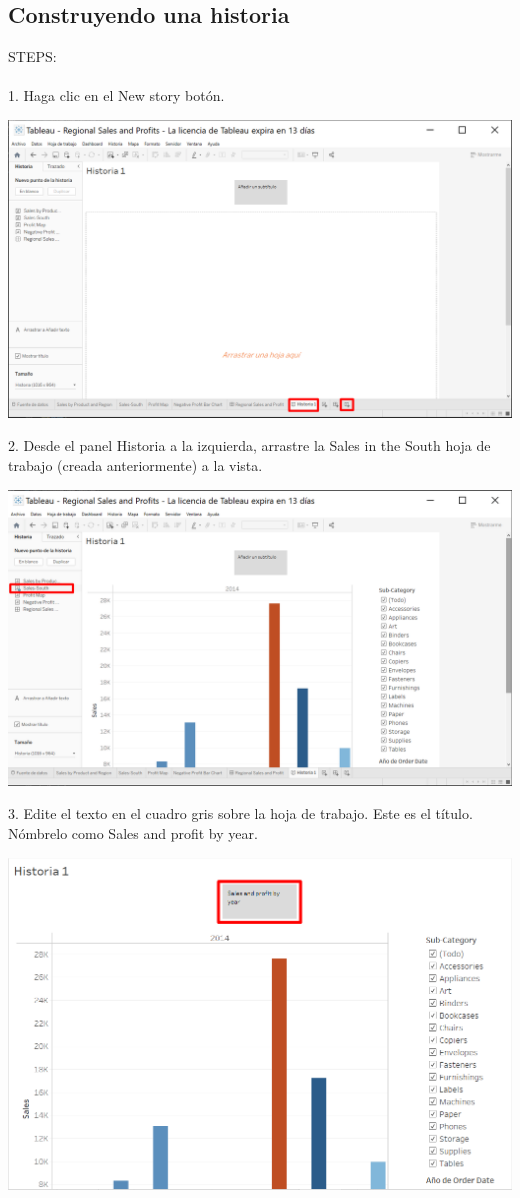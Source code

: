 \documentclass[12pt,letterpaper]{article}
\begin{document}
\subsection{Construyendo una historia}
STEPS:
\\\\1. Haga clic en el New story botón.
\begin{center}
    \includegraphics[width=16cm]{img/59.png}  
\end{center}
2. Desde el panel Historia a la izquierda, arrastre la Sales in the South hoja de trabajo
(creada anteriormente) a la vista.
\begin{center}
    \includegraphics[width=16cm]{img/60.png}  
\end{center}
3. Edite el texto en el cuadro gris sobre la hoja de trabajo. Este es el título. Nómbrelo como Sales
and profit by year.
\begin{center}
    \includegraphics[width=16cm]{img/61.png}  
\end{center}
\end{document}
